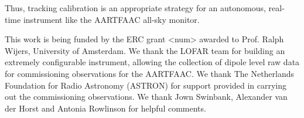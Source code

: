 \documentclass{aa}
\begin{document}
Thus,  tracking calibration  is an appropriate  strategy for  an autonomous,
real-time instrument like the AARTFAAC all-sky monitor.


\begin {acknowledgements}

This work is being funded by the ERC grant <num> awarded to Prof.  Ralph Wijers,
University of  Amsterdam. We thank the  LOFAR team for  building an extremely
configurable instrument,  allowing the collection  of dipole level raw  data for
commissioning observations for the AARTFAAC. We thank The Netherlands Foundation
for  Radio  Astronomy  (ASTRON)  for   support  provided  in  carrying  out  the
commissioning observations. We thank Jown  Swinbank, Alexander van der Horst and
Antonia Rowlinson for helpful comments.
\end{acknowledgements}


\end{document}
